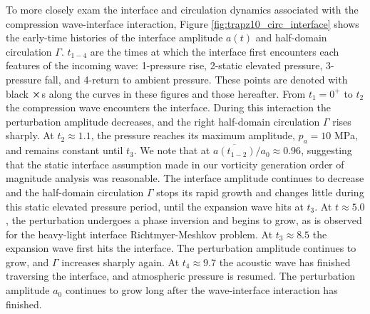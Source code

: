 To more closely exam the interface and circulation dynamics associated
with the compression wave-interface interaction, Figure
\ref{fig:trapz10_circ_interface} shows the early-time histories of the
interface amplitude $a(t)$ and half-domain circulation
$\Gamma$. $t_{1-4}$ are the times at which the interface first
encounters each features of the incoming wave: 1-pressure rise,
2-static elevated pressure, 3-pressure fall, and 4-return to ambient
pressure. These points are denoted with black $\boldsymbol{\times}$s along the
curves in these figures and those hereafter. From $t_1=0^+$ to $t_2$
the compression wave encounters the interface. During this interaction
the perturbation amplitude decreases, and the right half-domain
circulation $\Gamma$ rises sharply. At $t_2\approx1.1$, the pressure
reaches its maximum amplitude, $p_a=10$ MPa, and remains constant
until $t_3$. We note that at $\overline{a(t_{1-2})}/a_0\approx0.96$,
suggesting that the static interface assumption made in our vorticity
generation order of magnitude analysis was reasonable. The interface
amplitude continues to decrease and the half-domain circulation
$\Gamma$ stops its rapid growth and changes little during this static
elevated pressure period, until the expansion wave hits at $t_3$. At
$t\approx 5.0$, the perturbation undergoes a phase inversion and
begins to grow, as is observed for the heavy-light interface
Richtmyer-Meshkov problem. At $t_3\approx8.5$ the expansion wave first
hits the interface. The perturbation amplitude continues to grow, and
$\Gamma$ increases sharply again. At $t_4\approx9.7$ the acoustic wave
has finished traversing the interface, and atmospheric pressure is
resumed. The perturbation amplitude $a_0$ continues to grow long after
the wave-interface interaction has finished.
%
